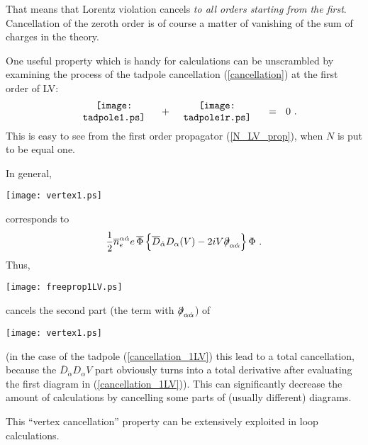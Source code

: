 \documentclass[12pt]{revtex4}
\newcommand{\slashed}[1]{\hbox{{$#1$}\llap{$/$}}}
\begin{document}
That means that Lorentz violation cancels
{\it to all orders starting from the first}.
Cancellation of the zeroth order is of course
a matter of vanishing of the sum of charges 
in the theory.

One useful property which is handy for calculations
can be unscrambled by examining the process of the
tadpole cancellation (\ref{cancellation}) at the first 
order of LV:
\begin{equation}
\label{cancellation_1LV}
\begin{minipage}[c]{3.0cm}
\centering
\texttt{[image: tadpole1.ps]} 
\end{minipage}
~+~
\begin{minipage}[c]{3.0cm}
\centering
\texttt{[image: tadpole1r.ps]} 
\end{minipage}
~~=~~
0
~.
\end{equation}
This is easy to see from the first order propagator
(\ref{N_LV_prop}), when $ N $ is put to be equal one.

In general, 
\begin{minipage}[b]{1.5cm}
\centering
\texttt{[image: vertex1.ps]} 
\vspace{-0.1cm}
\end{minipage}
corresponds to
\[
\frac{1}{2} \overline{n}_e^{\alpha\dot\alpha}
e\, \overline{\Phi}\,
\Bigl\{
\overline{D}_{\dot\alpha} D_\alpha ( V )
- 
2 i V \slashed{\partial}_{\alpha\dot\alpha}
\Bigr\}\,
 \Phi
~.
\] 
Thus, 
\begin{minipage}[b]{1.7cm}
\centering
\texttt{[image: freeprop1LV.ps]} 
\vspace{-0.06cm}
\end{minipage}
cancels the second part
(the term with $ \slashed{\partial}_{\alpha\dot\alpha}$)
of 
\begin{minipage}[b]{1.5cm}
\centering
\texttt{[image: vertex1.ps]} 
\vspace{-0.1cm}
\end{minipage}
(in the case of the tadpole (\ref{cancellation_1LV}) 
this lead to a total 
cancellation,
because the 
$ \overline{D}_{\dot\alpha} D_\alpha V $
part obviously turns into a total derivative after evaluating
the first diagram in (\ref{cancellation_1LV})).
This can significantly decrease the amount of calculations
by cancelling some parts of (usually different) diagrams.

This ``vertex cancellation'' property can be extensively
exploited in loop calculations.
\end{document}
